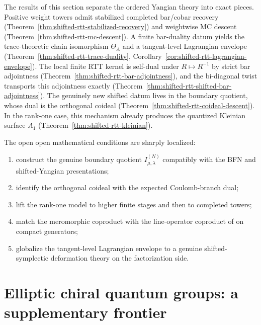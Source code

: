 \begin{remark}
\label{rem:shifted-rtt-synthesis}
The results of this section separate the ordered Yangian theory
into exact pieces. Positive weight towers admit stabilized completed
bar/cobar recovery
(Theorem~\ref{thm:shifted-rtt-stabilized-recovery}) and weightwise MC
descent (Theorem~\ref{thm:shifted-rtt-mc-descent}). A finite
bar-duality datum yields the trace-theoretic chain isomorphism
$\Theta_A$ and a tangent-level Lagrangian envelope
(Theorem~\ref{thm:shifted-rtt-trace-duality},
Corollary~\ref{cor:shifted-rtt-lagrangian-envelope}). The local
finite RTT kernel is self-dual under $R \mapsto R^{-1}$ by strict bar
adjointness (Theorem~\ref{thm:shifted-rtt-bar-adjointness}), and the
bi-diagonal twist transports this adjointness exactly
(Theorem~\ref{thm:shifted-rtt-shifted-bar-adjointness}). The
genuinely new shifted datum lives in the boundary quotient, whose dual
is the orthogonal coideal
(Theorem~\ref{thm:shifted-rtt-coideal-descent}). In the rank-one
case, this mechanism already produces the quantized Kleinian surface
$A_1$ (Theorem~\ref{thm:shifted-rtt-kleinian}).

The open open mathematical conditions are sharply localized:
\begin{enumerate}[label=\textup{(\roman*)}]
\item construct the genuine boundary quotient
 $I_{\mu,\lambda}^{(N)}$ compatibly with the BFN and shifted-Yangian
 presentations;
\item identify the orthogonal coideal with the expected
 Coulomb-branch dual;
\item lift the rank-one model to higher finite stages and then to
 completed towers;
\item match the meromorphic coproduct with the line-operator
 coproduct of \cite{DNP25} on compact generators;
\item globalize the tangent-level Lagrangian envelope to a genuine
 shifted-symplectic deformation theory on the factorization side.
\end{enumerate}
\end{remark}

\section{Elliptic chiral quantum groups: a supplementary frontier}
\label{sec:elliptic-chiral-qg-supplement}

